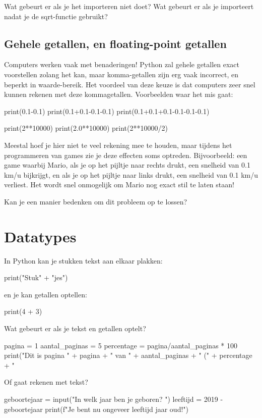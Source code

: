 \documentclass[10pt,a4paper]{article}
\newenvironment{task}{\smallpencil}{}
\newcommand{\optional}{\Info \thinspace}
\begin{document}
\begin{task}
Wat gebeurt er als je het importeren niet doet? Wat gebeurt er als je importeert nadat je de sqrt-functie gebruikt?
\end{task}


\subsection{\optional Gehele getallen, en floating-point getallen}
Computers werken vaak met benaderingen! Python zal gehele getallen exact voorstellen zolang het kan, maar komma-getallen zijn erg vaak incorrect, en beperkt in waarde-bereik. Het voordeel van deze keuze is dat computers zeer snel kunnen rekenen met deze kommagetallen. Voorbeelden waar het mis gaat:
\begin{python}
print(0.1-0.1)
print(0.1+0.1-0.1-0.1)
print(0.1+0.1+0.1-0.1-0.1-0.1)

print(2**10000)
print(2.0**10000)
print(2**10000/2)
\end{python}
Meestal hoef je hier niet te veel rekening mee te houden, maar tijdens het programmeren van games zie je deze effecten soms optreden. Bijvoorbeeld: een game waarbij Mario, als je op het pijltje naar rechts drukt, een snelheid van 0.1 km/u bijkrijgt, en als je op het pijltje naar links drukt, een snelheid van 0.1 km/u verliest. Het wordt snel onmogelijk om Mario nog exact stil te laten staan!

\begin{task}
Kan je een manier bedenken om dit probleem op te lossen?
\end{task}

\section{Datatypes}
In Python kan je stukken tekst aan elkaar plakken:
\begin{python}
print("Stuk" + "jes")
\end{python}
en je kan getallen optellen:
\begin{python}
print(4 + 3)
\end{python}
Wat gebeurt er als je tekst en getallen optelt?
\begin{python}
pagina = 1
aantal_paginas = 5
percentage = pagina/aantal_paginas * 100
print("Dit is pagina " + pagina + " van " + aantal_paginas + " (" + percentage + "%
\end{python}
Of gaat rekenen met tekst?
\begin{python}
geboortejaar = input("In welk jaar ben je geboren? ")
leeftijd = 2019 - geboortejaar
print(f"Je bent nu ongeveer {leeftijd} jaar oud!")
\end{python}
\end{document}

